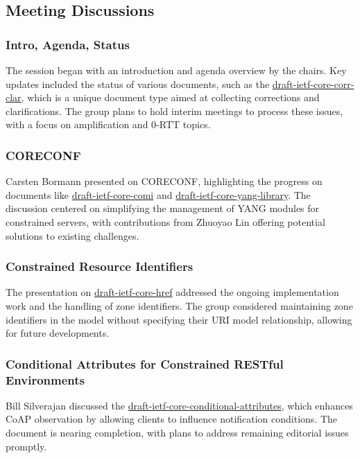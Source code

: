 \documentclass{article}
\begin{document}
\subsection{Meeting Discussions}

\subsubsection{Intro, Agenda, Status}
The session began with an introduction and agenda overview by the chairs. Key updates included the status of various documents, such as the \href{https://datatracker.ietf.org/doc/html/draft-ietf-core-corr-clar}{draft-ietf-core-corr-clar}, which is a unique document type aimed at collecting corrections and clarifications. The group plans to hold interim meetings to process these issues, with a focus on amplification and 0-RTT topics.

\subsubsection{CORECONF}
Carsten Bormann presented on CORECONF, highlighting the progress on documents like \href{https://datatracker.ietf.org/doc/html/draft-ietf-core-comi}{draft-ietf-core-comi} and \href{https://datatracker.ietf.org/doc/html/draft-ietf-core-yang-library}{draft-ietf-core-yang-library}. The discussion centered on simplifying the management of YANG modules for constrained servers, with contributions from Zhuoyao Lin offering potential solutions to existing challenges.

\subsubsection{Constrained Resource Identifiers}
The presentation on \href{https://datatracker.ietf.org/doc/html/draft-ietf-core-href}{draft-ietf-core-href} addressed the ongoing implementation work and the handling of zone identifiers. The group considered maintaining zone identifiers in the model without specifying their URI model relationship, allowing for future developments.

\subsubsection{Conditional Attributes for Constrained RESTful Environments}
Bill Silverajan discussed the \href{https://datatracker.ietf.org/doc/html/draft-ietf-core-conditional-attributes}{draft-ietf-core-conditional-attributes}, which enhances CoAP observation by allowing clients to influence notification conditions. The document is nearing completion, with plans to address remaining editorial issues promptly.
\end{document}
